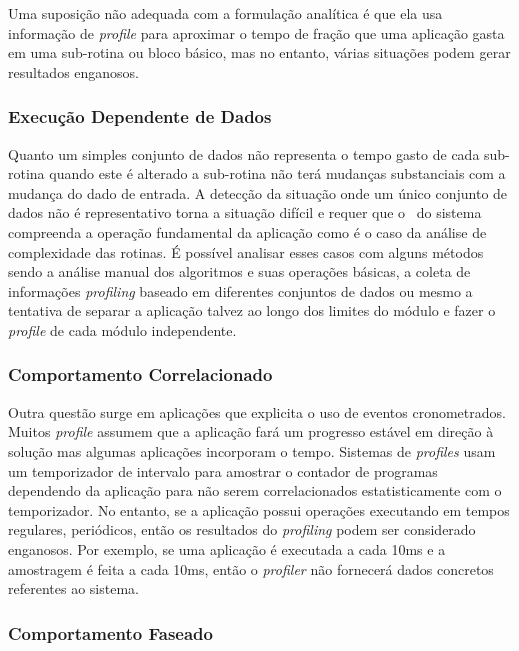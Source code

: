 			Uma suposição não adequada com a formulação analítica é que ela usa informação de \textit{profile} para aproximar o tempo de fração que uma aplicação gasta em uma sub-rotina ou bloco básico, mas no entanto, várias situações podem gerar resultados enganosos.



		\subsubsection{Execução Dependente de Dados}

			Quanto um simples conjunto de dados não representa o tempo gasto de cada sub-rotina quando este é alterado a sub-rotina não terá mudanças substanciais com a mudança do dado de entrada. A detecção da situação onde um único conjunto de dados não é representativo torna a situação difícil e requer que o \designer\ do sistema compreenda a operação fundamental da aplicação como é o caso da análise de complexidade das rotinas. É possível analisar esses casos com alguns métodos sendo a análise manual dos algoritmos e suas operações básicas, a coleta de informações \textit{profiling} baseado em diferentes conjuntos de dados ou mesmo a tentativa de separar a aplicação talvez ao longo dos limites do módulo e fazer o \textit{profile} de cada módulo independente.

		\subsubsection{Comportamento Correlacionado}

			Outra questão surge em aplicações que explicita o uso de eventos cronometrados. Muitos \textit{profile} assumem que a aplicação fará um progresso estável em direção à solução mas algumas aplicações incorporam o tempo. Sistemas de \textit{profiles} usam um temporizador de intervalo para amostrar o contador de programas dependendo da aplicação para não serem correlacionados estatisticamente com o temporizador. No entanto, se a aplicação possui operações executando em tempos regulares, periódicos, então os resultados do \textit{profiling} podem ser considerado enganosos. Por exemplo, se uma aplicação é executada a cada 10ms e a amostragem é feita a cada 10ms, então o \textit{profiler} não fornecerá dados concretos referentes ao sistema.



		\subsubsection{Comportamento Faseado}

